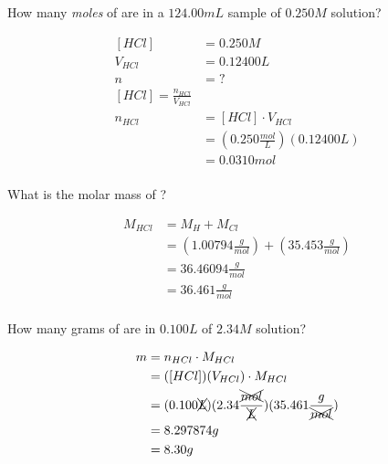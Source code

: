 \documentclass[11pt,addpoints]{exam}   	%
\begin{document}
\begin{questions}
\question[5] How many \emph{moles} of  are in a $124.00 mL$ sample of $0.250 M$ solution?

\begin{solution}
\begin{equation} 
\begin{split}
    [HCl] &= 0.250 M \\
    V_{HCl} &= 0.12400 L\\
    n &= ?\\
    [HCl] = \frac{n_{HCl}}{V_{HCl}} \\
    n_{HCl} &= [HCl] \cdot V_{HCl} \\
                 &= (0.250 \frac{mol}{L})(0.12400 L) \\
                 &= 0.0310 mol \\
 \end{split}
 \end{equation}
\end{solution}

\question[5]  What is the molar mass of ?

\begin{solution}
\begin{equation} 
\begin{split}
    M_{HCl} &= M_{H} + M_{Cl} \\
                  &= (1.00794 \frac{g}{mol}) + (35.453 \frac{g}{mol}) \\
                  &= 36.46094 \frac{g}{mol} \\
                  &= 36.461 \frac{g}{mol} \\
 \end{split}
 \end{equation}
\end{solution}

\clearpage
\question[5]  How many grams of  are in $0.100 L$ of $2.34 M$ solution?

\begin{solution}
\begin{equation} 
\begin{split}
    m &= n_{HCl} \cdot M_{HCl} \\
        &= ([HCl])(V_{HCl}) \cdot M_{HCl} \\
        &= (0.100 \xcancel{L}) (2.34 \frac{\xcancel{mol}}{\xcancel{L}}) (35.461 \frac{g}{\xcancel{mol}}) \\
        &= 8.297874 g \\
        &= 8.30 g
 \end{split}
 \end{equation}
\end{solution}


\end{questions}
\end{document}
